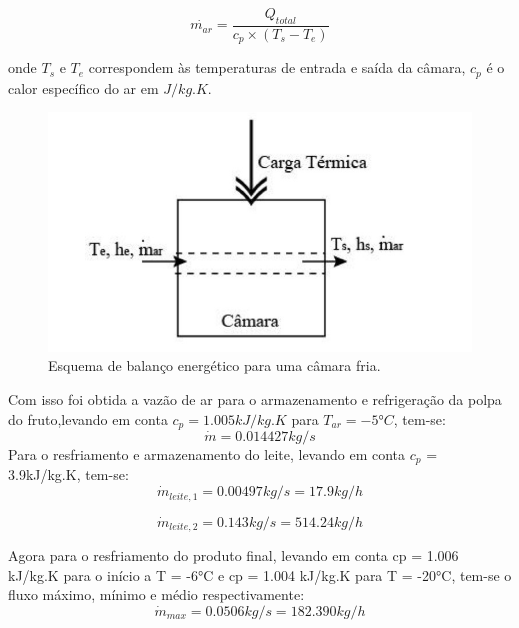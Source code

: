 \documentclass[10pt,a4paper]{article}
\begin{document}
\begin{equation}
    \dot{m_{ar}} = \frac{Q_{total}}{c_p \times (T_s - T_e)}
    \label{vazao_ar}
\end{equation}

onde $T_s$ e $T_e$ correspondem às temperaturas de entrada e saída da câmara, $c_p$ é o calor específico do ar em $J/kg.K$.

\begin{figure}[H]
    \centering
    \includegraphics[scale=0.6]{Figuras/balanco_energia_camara.jpg}
    \caption{Esquema de balanço energético para uma câmara fria.}
    \label{fluxo_camara_ar}
\end{figure}

Com isso foi obtida a vazão de ar para o armazenamento e refrigeração da polpa do fruto,levando em conta $c_p = 1.005kJ/kg.K$ para $T_{ar} = -5 °C$, tem-se:
\begin{equation}
     \dot{m} = 0.014427kg/s
\end{equation}
 Para o resfriamento e armazenamento do leite, levando em conta $c_p$ = 3.9kJ/kg.K, tem-se:
 \begin{equation}
     \dot{m}_{leite,1} = 0.00497kg/s = 17.9kg/h
 \end{equation}
 
 \begin{equation}
     \dot{m}_{leite,2} = 0.143kg/s = 514.24kg/h
 \end{equation}
 
 Agora para o resfriamento do produto final, levando em conta cp = 1.006 kJ/kg.K  para o início a T = -6°C e cp = 1.004 kJ/kg.K para T = -20°C, tem-se o fluxo máximo, mínimo e médio respectivamente:
 \begin{equation}
     \dot{m}_{max} = 0.0506kg/s = 182.390 kg/h
 \end{equation}
    
\end{document}
